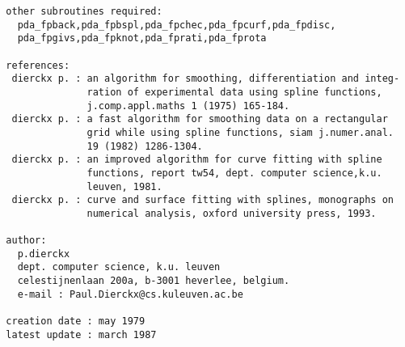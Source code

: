 \begin{verbatim}
  other subroutines required:
    pda_fpback,pda_fpbspl,pda_fpchec,pda_fpcurf,pda_fpdisc,
    pda_fpgivs,pda_fpknot,pda_fprati,pda_fprota

  references:
   dierckx p. : an algorithm for smoothing, differentiation and integ-
                ration of experimental data using spline functions,
                j.comp.appl.maths 1 (1975) 165-184.
   dierckx p. : a fast algorithm for smoothing data on a rectangular
                grid while using spline functions, siam j.numer.anal.
                19 (1982) 1286-1304.
   dierckx p. : an improved algorithm for curve fitting with spline
                functions, report tw54, dept. computer science,k.u.
                leuven, 1981.
   dierckx p. : curve and surface fitting with splines, monographs on
                numerical analysis, oxford university press, 1993.

  author:
    p.dierckx
    dept. computer science, k.u. leuven
    celestijnenlaan 200a, b-3001 heverlee, belgium.
    e-mail : Paul.Dierckx@cs.kuleuven.ac.be

  creation date : may 1979
  latest update : march 1987
\end{verbatim}



